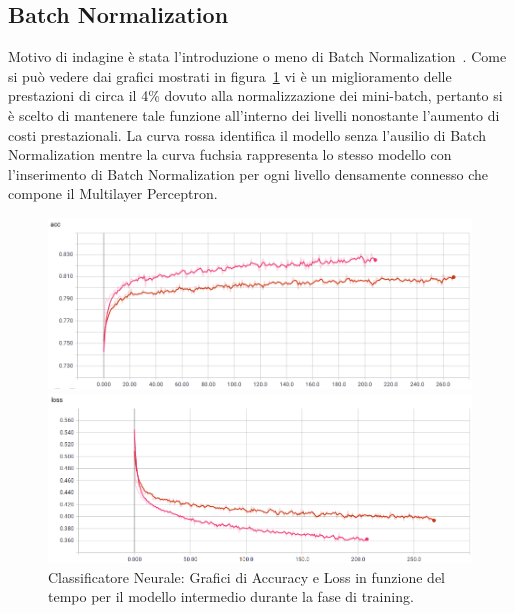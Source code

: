 \newpage
\subsection{Batch Normalization}
Motivo di indagine è stata l'introduzione o meno di Batch Normalization~\cite{1502.03167}. Come si può vedere dai grafici mostrati in figura~\ref{fig:batchnorm} vi è un miglioramento delle prestazioni di circa il 4\% dovuto alla normalizzazione dei mini-batch, pertanto si è scelto di mantenere tale funzione all'interno dei livelli nonostante l'aumento di costi prestazionali. La curva rossa identifica il modello senza l'ausilio di Batch Normalization mentre la curva fuchsia rappresenta lo stesso modello con l'inserimento di Batch Normalization per ogni livello densamente connesso che compone il Multilayer Perceptron.

\begin{figure}[!bp] 
	\begin{minipage}[t]{\linewidth}
		\includegraphics[width=\linewidth]{figures/MLP_batchnorm1.png}
	\end{minipage}
	\begin{minipage}[b]{\linewidth}
		\includegraphics[width=\linewidth]{figures/MLP_batchnorm2.png}
	\end{minipage}
	\caption{Classificatore Neurale: Grafici di Accuracy e Loss in funzione del tempo per il modello intermedio durante la fase di training. \label{fig:batchnorm}}
\end{figure}

